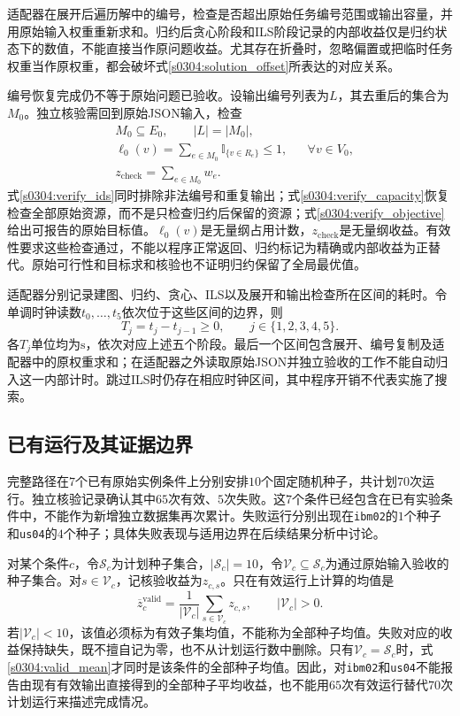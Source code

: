 适配器在展开后遍历解中的编号，检查是否超出原始任务编号范围或输出容量，并用原始输入权重重新求和。归约后贪心阶段和ILS阶段记录的内部收益仅是归约状态下的数值，不能直接当作原问题收益。尤其存在折叠时，忽略偏置或把临时任务权重当作原权重，都会破坏式\eqref{s0304:solution_offset}所表达的对应关系。

编号恢复完成仍不等于原始问题已验收。设输出编号列表为$L$，其去重后的集合为$M_0$。独立核验需回到原始JSON输入，检查
\begin{align}
 &M_0\subseteq E_0,\qquad |L|=|M_0|,
 \label{s0304:verify_ids}\\
 &\ell_0(v)=\sum_{e\in M_0}\mathbb{I}_{\{v\in R_e\}}\leq1,
 &&\forall v\in V_0,
 \label{s0304:verify_capacity}\\
 &z_{\mathrm{check}}=\sum_{e\in M_0}w_e.
 \label{s0304:verify_objective}
\end{align}
式\eqref{s0304:verify_ids}同时排除非法编号和重复输出；式\eqref{s0304:verify_capacity}恢复检查全部原始资源，而不是只检查归约后保留的资源；式\eqref{s0304:verify_objective}给出可报告的原始目标值。$\ell_0(v)$是无量纲占用计数，$z_{\mathrm{check}}$是无量纲收益。有效性要求这些检查通过，不能以程序正常返回、归约标记为精确或内部收益为正替代。原始可行性和目标求和核验也不证明归约保留了全局最优值。

适配器分别记录建图、归约、贪心、ILS以及展开和输出检查所在区间的耗时。令单调时钟读数$t_0,\ldots,t_5$依次位于这些区间的边界，则
\begin{equation}
 T_j=t_j-t_{j-1}\geq0,
 \qquad j\in\{1,2,3,4,5\}.
 \label{s0304:stage_times}
\end{equation}
各$T_j$单位均为$\mathrm{s}$，依次对应上述五个阶段。最后一个区间包含展开、编号复制及适配器中的原权重求和；在适配器之外读取原始JSON并独立验收的工作不能自动归入这一内部计时。跳过ILS时仍存在相应时钟区间，其中程序开销不代表实施了搜索。

\subsection{已有运行及其证据边界}

完整路径在$7$个已有原始实例条件上分别安排$10$个固定随机种子，共计划$70$次运行。独立核验记录确认其中$65$次有效、$5$次失败。这$7$个条件已经包含在已有实验条件中，不能作为新增独立数据集再次累计。失败运行分别出现在\texttt{ibm02}的$1$个种子和\texttt{us04}的$4$个种子；具体失败表现与适用边界在后续结果分析中讨论。

对某个条件$c$，令$\mathcal{S}_c$为计划种子集合，$|\mathcal{S}_c|=10$，令$\mathcal{V}_c\subseteq\mathcal{S}_c$为通过原始输入验收的种子集合。对$s\in\mathcal{V}_c$，记核验收益为$z_{c,s}$。只在有效运行上计算的均值是
\begin{equation}
 \overline z_c^{\mathrm{valid}}
 =\frac{1}{|\mathcal{V}_c|}
 \sum_{s\in\mathcal{V}_c}z_{c,s},
 \qquad |\mathcal{V}_c|>0.
 \label{s0304:valid_mean}
\end{equation}
若$|\mathcal{V}_c|<10$，该值必须标为有效子集均值，不能称为全部种子均值。失败对应的收益保持缺失，既不擅自记为零，也不从计划运行数中删除。只有$\mathcal{V}_c=\mathcal{S}_c$时，式\eqref{s0304:valid_mean}才同时是该条件的全部种子均值。因此，对\texttt{ibm02}和\texttt{us04}不能报告由现有有效输出直接得到的全部种子平均收益，也不能用$65$次有效运行替代$70$次计划运行来描述完成情况。

